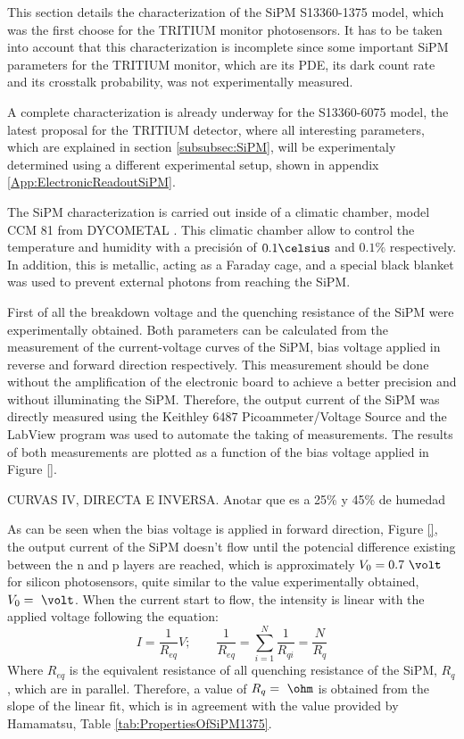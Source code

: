 This section details the characterization of the SiPM S13360-1375 model, which was the first choose for the TRITIUM monitor photosensors. It has to be taken into account that this characterization is incomplete since some important SiPM parameters for the TRITIUM monitor, which are its PDE, its dark count rate and its crosstalk probability, was not experimentally measured. 

A complete characterization is already underway for the S13360-6075 model, the latest proposal for the TRITIUM detector, where all interesting parameters, which are explained in section \ref{subsubsec:SiPM}, will be experimentaly determined using a different experimental setup, shown in appendix \ref{App:ElectronicReadoutSiPM}.

The SiPM characterization is carried out inside of a climatic chamber, model CCM 81 from DYCOMETAL \cite{ClimaticChamberIFIMED}. This climatic chamber allow to control the temperature and humidity with a precisión of $0.1\celsius$ and $0.1\%$ respectively. In addition, this is metallic, acting as a Faraday cage, and a special black blanket \cite{BlackBlancket} was used to prevent external photons from reaching the SiPM.

First of all the breakdown voltage and the quenching resistance of the SiPM were experimentally obtained. Both parameters can be calculated from the measurement of the current-voltage curves of the SiPM, bias voltage applied in reverse and forward direction respectively. This measurement should be done without the amplification of the electronic board to achieve a better precision and without illuminating the SiPM. Therefore, the output current of the SiPM was directly measured using the Keithley 6487 Picoammeter/Voltage Source \cite{DataSheetKeithley6487} and the LabView program was used to automate the taking of measurements. The results of both measurements are plotted as a function of the bias voltage applied in Figure \ref{}.

CURVAS IV, DIRECTA E INVERSA. Anotar que es a 25\% y 45\% de humedad

As can be seen when the bias voltage is applied in forward direction, Figure \ref{}, the output current of the SiPM doesn't flow until the potencial difference existing between the n and p layers are reached, which is approximately $V_0=0.7~\volt$ for silicon photosensors, quite similar to the value experimentally obtained, $V_0= ~\volt$. When the current start to flow, the intensity is linear with the applied voltage following the equation:
\begin{equation}
I=\frac{1}{R_{eq}}V;  \qquad \frac{1}{R_{eq}} = \sum_{i=1}^{N}\frac{1}{R_{qi}}= \frac{N}{R_{q}}
\label{QuenchingResistance}
\end{equation}
Where $R_{eq}$ is the equivalent resistance of all quenching resistance of the SiPM, $R_{q}$, which are in parallel. Therefore, a value of $R_{q}= ~\ohm$ is obtained from the slope of the linear fit, which is in agreement with the value provided by Hamamatsu, Table \ref{tab:PropertiesOfSiPM1375}.

